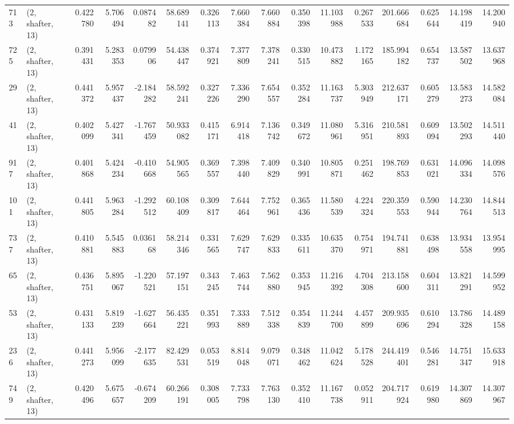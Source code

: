 \begin{tabular}{llrrrrrrrrrrrrrr}
713  &  (2, shafter, 13) &   0.422780 &   5.706494 &   0.087482 &     58.689141 &    0.326113 &    7.660384 &    7.660884 &  0.350398 &  11.103988 &   0.267533 &   201.666684 &   0.625644 &  14.198419 &  14.200940 \\
725  &  (2, shafter, 13) &   0.391431 &   5.283353 &   0.079906 &     54.438447 &    0.374921 &    7.377809 &    7.378241 &  0.330515 &  10.473882 &   1.172165 &   185.994182 &   0.654737 &  13.587502 &  13.637968 \\
29   &  (2, shafter, 13) &   0.441372 &   5.957437 &  -2.184282 &     58.592241 &    0.327226 &    7.336290 &    7.654557 &  0.352284 &  11.163737 &   5.303949 &   212.637171 &   0.605279 &  13.583273 &  14.582084 \\
41   &  (2, shafter, 13) &   0.402099 &   5.427341 &  -1.767459 &     50.933082 &    0.415171 &    6.914418 &    7.136742 &  0.349672 &  11.080961 &   5.316951 &   210.581893 &   0.609094 &  13.502293 &  14.511440 \\
917  &  (2, shafter, 13) &   0.401868 &   5.424234 &  -0.410668 &     54.905565 &    0.369557 &    7.398440 &    7.409829 &  0.340991 &  10.805871 &   0.251462 &   198.769853 &   0.631021 &  14.096334 &  14.098576 \\
101  &  (2, shafter, 13) &   0.441805 &   5.963284 &  -1.292512 &     60.108409 &    0.309817 &    7.644464 &    7.752961 &  0.365436 &  11.580539 &   4.224324 &   220.359553 &   0.590944 &  14.230764 &  14.844513 \\
737  &  (2, shafter, 13) &   0.410881 &   5.545883 &   0.036168 &     58.214346 &    0.331565 &    7.629747 &    7.629833 &  0.335611 &  10.635370 &   0.754971 &   194.741881 &   0.638498 &  13.934558 &  13.954995 \\
65   &  (2, shafter, 13) &   0.436751 &   5.895067 &  -1.220521 &     57.197151 &    0.343245 &    7.463744 &    7.562880 &  0.353945 &  11.216392 &   4.704308 &   213.158600 &   0.604311 &  13.821291 &  14.599952 \\
53   &  (2, shafter, 13) &   0.431133 &   5.819239 &  -1.627664 &     56.435221 &    0.351993 &    7.333889 &    7.512338 &  0.354839 &  11.244700 &   4.457899 &   209.935696 &   0.610294 &  13.786328 &  14.489158 \\
236  &  (2, shafter, 13) &   0.441273 &   5.956099 &  -2.177635 &     82.429531 &    0.053519 &    8.814048 &    9.079071 &  0.348462 &  11.042624 &   5.178528 &   244.419401 &   0.546281 &  14.751347 &  15.633918 \\
749  &  (2, shafter, 13) &   0.420496 &   5.675657 &  -0.674209 &     60.266191 &    0.308005 &    7.733798 &    7.763130 &  0.352410 &  11.167738 &   0.052911 &   204.717924 &   0.619980 &  14.307869 &  14.307967 \\

\end{tabular}

